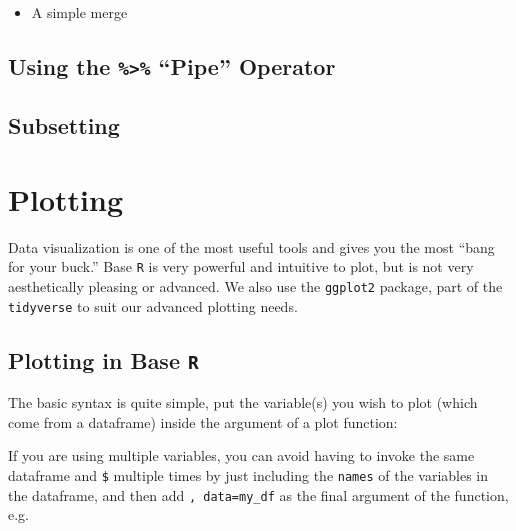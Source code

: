 \documentclass[]{book}
\newenvironment{Shaded}{\begin{snugshade}}{\end{snugshade}}
\newcommand{\KeywordTok}[1]{\textcolor[rgb]{0.13,0.29,0.53}{\textbf{#1}}}
\newcommand{\OperatorTok}[1]{\textcolor[rgb]{0.81,0.36,0.00}{\textbf{#1}}}
\newcommand{\NormalTok}[1]{#1}
\providecommand{\tightlist}{%
  \setlength{\itemsep}{0pt}\setlength{\parskip}{0pt}}
\theoremstyle{definition}
\theoremstyle{definition}
\theoremstyle{definition}
\theoremstyle{remark}
\begin{document}
\begin{itemize}
\tightlist
\item
  A simple merge
\end{itemize}

\section{\texorpdfstring{Using the \texttt{\%\textgreater{}\%} ``Pipe''
Operator}{Using the \%\textgreater{}\% Pipe Operator}}\label{using-the-pipe-operator}

\section{Subsetting}\label{subsetting}

\hypertarget{plotting}{\chapter{Plotting}\label{plotting}}

Data visualization is one of the most useful tools and gives you the
most ``bang for your buck.'' Base \texttt{R} is very powerful and
intuitive to plot, but is not very aesthetically pleasing or advanced.
We also use the \texttt{ggplot2} package, part of the \texttt{tidyverse}
to suit our advanced plotting needs.

\section{\texorpdfstring{Plotting in Base
\texttt{R}}{Plotting in Base R}}\label{plotting-in-base-r}

The basic syntax is quite simple, put the variable(s) you wish to plot
(which come from a dataframe) inside the argument of a plot function:

\begin{Shaded}
\end{Shaded}

If you are using multiple variables, you can avoid having to invoke the
same dataframe and \texttt{\$} multiple times by just including the
\texttt{names} of the variables in the dataframe, and then add
\texttt{,\ data=my\_df} as the final argument of the function, e.g.
\end{document}
